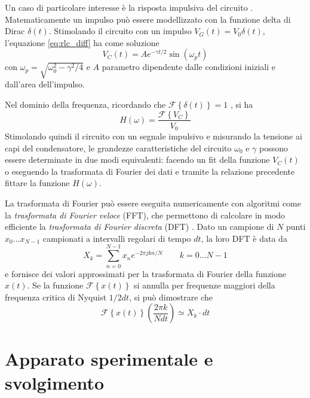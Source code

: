 \documentclass[12pt,a4paper, twocolumn]{article}
\newcommand{\fourier}[1]{\mathcal{F}\left\{#1\right\}}
\begin{document}
Un caso di particolare interesse è la risposta impulsiva del circuito \cite{cafarelli2012rlc}. Matematicamente un impulso può essere modellizzato con la funzione delta di Dirac $\delta(t)$. Stimolando il circuito con un impulso $V_G(t) = V_0 \delta(t)$, l'equazione \eqref{eq:rlc_diff} ha come soluzione
\begin{equation}
V_C(t) = Ae^{- \gamma t / 2}\sin{(\omega_p t)}
\label{eq:time_impulse}
\end{equation}
con $\omega_p = \sqrt{\omega_0^2 - \gamma^2 / 4}$ e $A$ parametro dipendente dalle condizioni iniziali e dall'area dell'impulso.

Nel dominio della frequenza, ricordando che $\fourier{\delta(t)} = 1$ \cite{fourier}, si ha 
\begin{equation}
H(\omega) = \frac{\fourier{V_C}}{V_0}
\label{eq:freqs_impulse}
\end{equation}
Stimolando quindi il circuito con un segnale impulsivo e misurando la tensione ai capi del condensatore, le grandezze caratteristiche del circuito $\omega_0$ e $\gamma$ possono essere determinate in due modi equivalenti: facendo un fit della funzione $V_C(t)$ o eseguendo la trasformata di Fourier dei dati e tramite la relazione precedente fittare la funzione $H(\omega)$.

La trasformata di Fourier può essere eseguita numericamente con algoritmi come la \emph{trasformata di Fourier veloce} (FFT), che permettono di  calcolare in modo efficiente la \emph{trasformata di Fourier discreta} (DFT) \cite{numerical_recipes}. Dato un campione di $N$ punti $x_0 \dots x_{N-1}$ campionati a intervalli regolari di tempo $dt$, la loro DFT è data da
\begin{equation}
X_k = \sum_{n=0}^{N-1} x_n e^{-2 \pi jkn / N} \qquad k = 0 \dots N-1
\label{eq:dft}
\end{equation}
e fornisce dei valori approssimati per la trasformata di Fourier della funzione $x(t)$. Se la funzione $\fourier{x(t)}$ si annulla per  frequenze maggiori della frequenza critica di Nyquist $1/2dt$, si può dimostrare che \cite{numerical_recipes}
\begin{equation}
\fourier{x(t)}\left(\frac{2\pi k}{N dt}\right) \simeq X_k \cdot dt
\label{eq:dft_fourier}
\end{equation}

\section{Apparato sperimentale e svolgimento}
\end{document}
